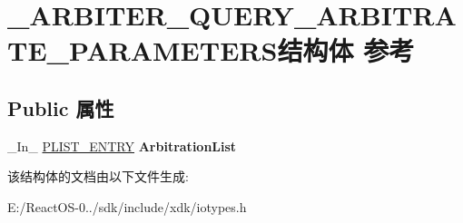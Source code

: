 \hypertarget{struct___a_r_b_i_t_e_r___q_u_e_r_y___a_r_b_i_t_r_a_t_e___p_a_r_a_m_e_t_e_r_s}{}\section{\+\_\+\+A\+R\+B\+I\+T\+E\+R\+\_\+\+Q\+U\+E\+R\+Y\+\_\+\+A\+R\+B\+I\+T\+R\+A\+T\+E\+\_\+\+P\+A\+R\+A\+M\+E\+T\+E\+R\+S结构体 参考}
\label{struct___a_r_b_i_t_e_r___q_u_e_r_y___a_r_b_i_t_r_a_t_e___p_a_r_a_m_e_t_e_r_s}
\subsection*{Public 属性}
\begin{DoxyCompactItemize}
\item 
\mbox{\label{struct___a_r_b_i_t_e_r___q_u_e_r_y___a_r_b_i_t_r_a_t_e___p_a_r_a_m_e_t_e_r_s_a0466696c4a852cb87fcb38d51ff549ce}} 
\+\_\+\+In\+\_\+ \hyperlink{struct___l_i_s_t___e_n_t_r_y}{P\+L\+I\+S\+T\+\_\+\+E\+N\+T\+RY} {\bfseries Arbitration\+List}
\end{DoxyCompactItemize}


该结构体的文档由以下文件生成\+:\begin{DoxyCompactItemize}
\item 
E\+:/\+React\+O\+S-\/0../sdk/include/xdk/iotypes.\+h\end{DoxyCompactItemize}
